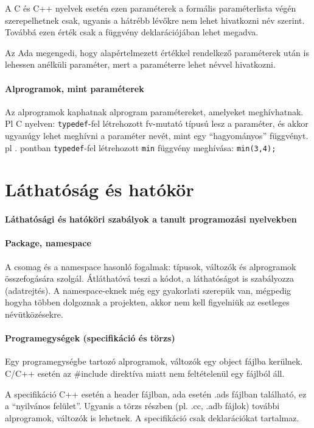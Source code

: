 \documentclass[fleqn,10pt,a4paper]{article}
\newcommand{\ut}[1]{\texttt{#1}}
\theoremstyle{magyar}
\begin{document}
  A C és C++ nyelvek esetén ezen paraméterek a formális paraméterlista
  végén szerepelhetnek csak, ugyanis a hátrébb lévőkre nem lehet
  hivatkozni név szerint. Továbbá ezen érték csak a függvény
  deklarációjában lehet megadva.

  Az Ada megengedi, hogy alapértelmezett értékkel rendelkező
  paraméterek után is lehessen anélküli paraméter, mert a paraméterre
  lehet névvel hivatkozni. 
 
 \paragraph{Alprogramok, mint paraméterek}
  Az alprogramok kaphatnak alprogram paramétereket, amelyeket
  meghívhatnak. Pl C nyelven: \ut{typedef}-fel létrehozott
  fv-mutató típusú lesz a paraméter, és akkor ugyanúgy lehet meghívni a
  paraméter nevét, mint egy ``hagyományos'' függvényt. pl 
  . pontban \ut{typedef}-fel létrehozott \ut{min}
  függvény meghívása: \ut{min(3,4);}
  
  \newpage
  \section{Láthatóság és hatókör}
  \paragraph[Láthatósági/hatókör szabályok]{Láthatósági és hatóköri
    szabályok a tanult programozási nyelvekben}
  
  \paragraph{Package, namespace}
  A csomag és a namespace hasonló fogalmak: típusok, változók és
  alprogramok összefogására szolgál. Átláthatóvá teszi a kódot,
  a láthatóságot is szabályozza (adatrejtés). A namespace-eknek még egy
  gyakorlati szerepük van, mégpedig hogyha többen dolgoznak a
  projekten, akkor nem kell figyelniük az esetleges névütközésekre.

  \paragraph{Programegységek (specifikáció és törzs)}
  Egy programegységbe tartozó alprogramok, változók egy object fájlba
  kerülnek. C/C++ esetén az \#include direktíva miatt nem feltételenül
  egy fájlból áll.

  A specifikáció C++ esetén a header fájlban, ada esetén .ads fájlban
  található, ez a ``nyilvános felület''. Ugyanis a törzs részben
  (pl. .cc, .adb fájlok) további alprogramok, változók is lehetnek. A
  specifikáció csak deklarációkat tartalmaz.
\end{document}

